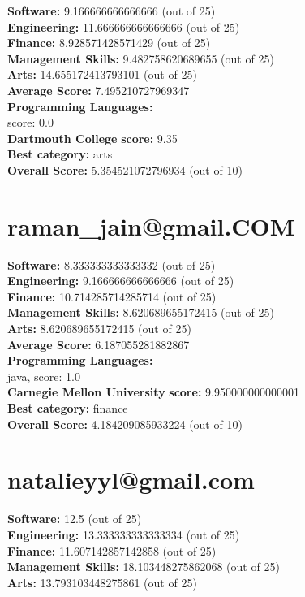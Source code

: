 \documentclass{article}
\begin{document}
\textbf{Software:} 9.166666666666666 (out of 25)\\
\textbf{Engineering: } 11.666666666666666 (out of 25)\\
\textbf{Finance:} 8.928571428571429 (out of 25)\\
\textbf{Management Skills:} 9.482758620689655 (out of 25)\\
\textbf{Arts:} 14.655172413793101 (out of 25)\\
\textbf{Average Score: } 7.495210727969347\\
\textbf{Programming Languages:} \\
score: 0.0\\
\textbf{Dartmouth College} \textbf{score:} 9.35\\
\textbf{Best category: } arts\\
\textbf{Overall Score: }5.354521072796934 (out of 10)\section{raman_jain@gmail.COM}
\textbf{Software:} 8.333333333333332 (out of 25)\\
\textbf{Engineering: } 9.166666666666666 (out of 25)\\
\textbf{Finance:} 10.714285714285714 (out of 25)\\
\textbf{Management Skills:} 8.620689655172415 (out of 25)\\
\textbf{Arts:} 8.620689655172415 (out of 25)\\
\textbf{Average Score: } 6.187055281882867\\
\textbf{Programming Languages:} \\
java, score: 1.0\\
\textbf{Carnegie Mellon University} \textbf{score:} 9.950000000000001\\
\textbf{Best category: } finance\\
\textbf{Overall Score: }4.184209085933224 (out of 10)\section{natalieyyl@gmail.com}
\textbf{Software:} 12.5 (out of 25)\\
\textbf{Engineering: } 13.333333333333334 (out of 25)\\
\textbf{Finance:} 11.607142857142858 (out of 25)\\
\textbf{Management Skills:} 18.103448275862068 (out of 25)\\
\textbf{Arts:} 13.793103448275861 (out of 25)\\
\end{document}
